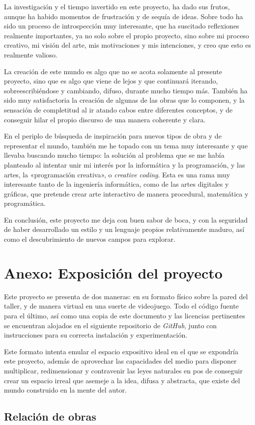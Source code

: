 La investigación y el tiempo invertido en este proyecto, ha dado sus
frutos, aunque ha habido momentos de frustración y de sequía de ideas.
Sobre todo ha sido un proceso de introspección muy interesante, que ha
suscitado reflexiones realmente importantes, ya no solo sobre el propio
proyecto, sino sobre mi proceso creativo, mi visión del arte, mis
motivaciones y mis intenciones, y creo que esto es realmente valioso.

La creación de este mundo es algo que no se acota solamente al presente
proyecto, sino que es algo que viene de lejos y que continuará iterando,
sobreescribiéndose y cambiando, difuso, durante mucho tiempo más.
También ha sido muy satisfactoria la creación de algunas de las obras
que lo componen, y la sensación de completitud al ir atando cabos entre
diferentes conceptos, y de conseguir hilar el propio discurso de una
manera coherente y clara.

En el periplo de búsqueda de inspiración para nuevos tipos de obra y de
representar el mundo, también me he topado con un tema muy interesante y
que llevaba buscando mucho tiempo: la solución al problema que se me
había planteado al intentar unir mi interés por la informática y la
programación, y las artes, la «programación creativa», o \emph{creative
coding}. Esta es una rama muy interesante tanto de la ingeniería
informática, como de las artes digitales y gráficas, que pretende crear
arte interactivo de manera procedural, matemática y programática.

En conclusión, este proyecto me deja con buen sabor de boca, y con la
seguridad de haber desarrollado un estilo y un lenguaje propios
relativamente maduro, así como el descubrimiento de nuevos campos para
explorar.

\hypertarget{anexo-exposiciuxf3n-del-proyecto}{%
\section{Anexo: Exposición del
proyecto}\label{anexo-exposiciuxf3n-del-proyecto}}

Este proyecto se presenta de dos maneras: en su formato físico sobre la
pared del taller, y de manera virtual en una suerte de videojuego. Todo
el código fuente para el último, así como una copia de este documento y
las licencias pertinentes se encuentran alojados en el siguiente
repositorio de \emph{GitHub}, junto con instrucciones para su correcta
instalación y experimentación.

Este formato intenta emular el espacio expositivo ideal en el que se
expondría este proyecto, además de aprovechar las capacidades del medio
para disponer multiplicar, redimensionar y contravenir las leyes
naturales en pos de conseguir crear un espacio irreal que asemeje a la
idea, difusa y abstracta, que existe del mundo construido en la mente
del autor.

\hypertarget{relaciuxf3n-de-obras}{%
\subsection{Relación de obras}\label{relaciuxf3n-de-obras}}
